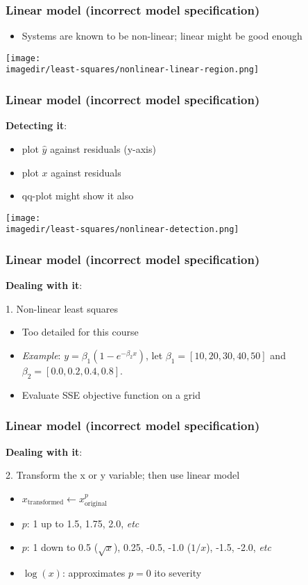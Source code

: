 \begin{frame}\frametitle{Linear model (incorrect model specification)}
	\begin{itemize}
		\item	Systems are known to be non-linear; linear might be good enough
	\end{itemize}
	\begin{center}
		\texttt{[image: \\imagedir/least-squares/nonlinear-linear-region.png]}
	\end{center}
\end{frame}

\begin{frame}\frametitle{Linear model (incorrect model specification)}

	\textbf{Detecting it}:
	\begin{itemize}
		\item	plot $\hat{y}$ against residuals (y-axis)
		\item	plot $x$ against residuals
		\item	qq-plot might show it also
	\end{itemize}
	\begin{center}
		\texttt{[image: \\imagedir/least-squares/nonlinear-detection.png]}
	\end{center}
\end{frame}

\begin{frame}\frametitle{Linear model (incorrect model specification)}

	\textbf{Dealing with it}:

	1. Non-linear least squares
	\begin{itemize}
		\item	Too detailed for this course
		\item	\emph{Example}: $y = \beta_1\left(1-e^{-\beta_2 x} \right)$, let $\beta_1 = [10, 20, 30, 40, 50]$ and $\beta_2 = [0.0, 0.2, 0.4, 0.8]$.
		\item	Evaluate SSE objective function on a grid
	\end{itemize}
\end{frame}

\begin{frame}\frametitle{Linear model (incorrect model specification)}

	\textbf{Dealing with it}:

	2. Transform the x or y variable; then use linear model
	\begin{itemize}
		\item	$x_\text{transformed} \leftarrow x^p_\text{original}$
		\item	$p$: 1 up to 1.5, 1.75, 2.0, \emph{etc}
		\item	$p$: 1 down to 0.5 ($\sqrt{x}$), 0.25, -0.5, -1.0 ($1/x$), -1.5, -2.0, \emph{etc}
		\item	$\log(x)$: approximates $p=0$ ito severity
	\end{itemize}
\end{frame}

